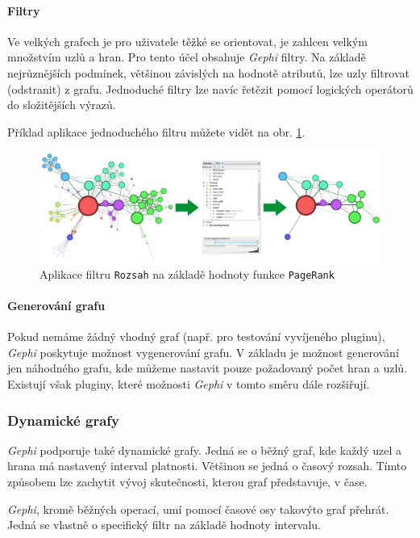 \documentclass[thesis=M,czech]{FITthesis}[2014/05/6]
\begin{document}
\paragraph{Filtry}
Ve velkých grafech je pro uživatele těžké se orientovat, je zahlcen velkým množstvím uzlů a hran. Pro tento účel obsahuje \textit{Gephi} filtry. Na základě nejrůznějších podmínek, většinou 
závislých na hodnotě atributů, lze uzly filtrovat (odstranit) z grafu. Jednoduché filtry lze navíc řetězit pomocí logických operátorů do složitějších výrazů.

Příklad aplikace jednoduchého filtru můžete vidět na obr. \ref{fig:gephi-filter}.

\begin{figure}\centering
 	\includegraphics[width=1\textwidth]{images/gephi/filter_before-after}
 	\caption[Aplikace filtru \texttt{Rozsah} na základě hodnoty funkce \texttt{PageRank}]{Aplikace filtru \texttt{Rozsah} na základě hodnoty funkce \texttt{PageRank}}\label{fig:gephi-filter}
\end{figure}

\paragraph{Generování grafu}
Pokud nemáme žádný vhodný graf (např. pro testování vyvíjeného pluginu), \textit{Gephi} poskytuje možnost vygenerování grafu. V základu je možnost generování jen náhodného grafu, kde můžeme
nastavit pouze požadovaný počet hran a uzlů. Existují však pluginy, které možnosti \textit{Gephi} v tomto směru dále rozšiřují.

\subsubsection{Dynamické grafy}
\textit{Gephi} podporuje také dynamické grafy. Jedná se o běžný graf, kde každý uzel a hrana má nastavený interval platnosti. Většinou se jedná o časový rozsah.
Tímto způsobem lze zachytit vývoj skutečnosti, kterou graf představuje, v čase.

\textit{Gephi}, kromě běžných operací, umí pomocí časové osy takovýto graf přehrát. Jedná se vlastně o specifický filtr na základě hodnoty intervalu.
\end{document}
